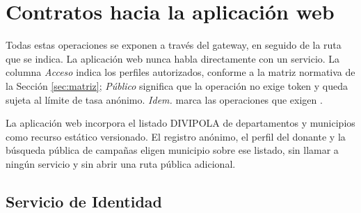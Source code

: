 \documentclass[11pt,a4paper]{article}
\newcommand{\id}[1]{\path{#1}}
\begin{document}
\section{Contratos hacia la aplicación web}
\label{sec:web}

Todas estas operaciones se exponen a través del gateway, en  seguido de la ruta que se indica. La aplicación web nunca habla directamente con un servicio. La columna \emph{Acceso} indica los perfiles autorizados, conforme a la matriz normativa de la Sección \ref{sec:matriz}; \emph{Público} significa que la operación no exige token y queda sujeta al límite de tasa anónimo. \emph{Idem.} marca las operaciones que exigen \id{Idempotency-Key}.

La aplicación web incorpora el listado DIVIPOLA de departamentos y municipios como recurso estático versionado. El registro anónimo, el perfil del donante y la búsqueda pública de campañas eligen municipio sobre ese listado, sin llamar a ningún servicio y sin abrir una ruta pública adicional.

\subsection{Servicio de Identidad}
\end{document}
